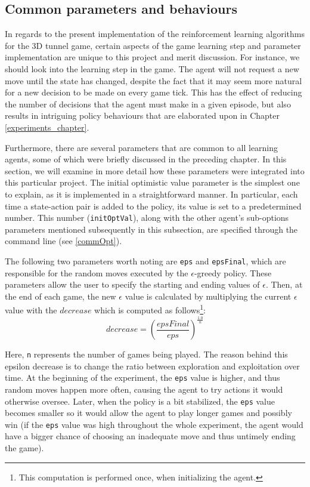 \subsection{Common parameters and behaviours}
\label{com_par_and_beh}
In regards to the present implementation of the reinforcement learning algorithms for the 3D tunnel game, certain aspects of the game learning step and parameter implementation are unique to this project and merit discussion. For instance, we should look into the learning step in the game. The agent will not request a new move until the state has changed, despite the fact that it may seem more natural for a new decision to be made on every game tick. This has the effect of reducing the number of decisions that the agent must make in a given episode, but also results in intriguing policy behaviours that are elaborated upon in Chapter \ref{experiments_chapter}.

Furthermore, there are several parameters that are common to all learning agents, some of which were briefly discussed in the preceding chapter. In this section, we will examine in more detail how these parameters were integrated into this particular project. The initial optimistic value parameter is the simplest one to explain, as it is implemented in a straightforward manner. In particular, each time a state-action pair is added to the policy, its value is set to a predetermined number. This number (\texttt{initOptVal}), along with the other agent's sub-options parameters mentioned subsequently in this subsection, are specified through the command line (see \ref{commOpt}).

The following two parameters worth noting are \texttt{eps} and \texttt{epsFinal}, which are responsible for the random moves executed by the $\epsilon$-greedy policy. These parameters allow the user to specify the starting and ending values of $\epsilon$. Then, at the end of each game, the new $\epsilon$ value is calculated by multiplying the current $\epsilon$ value with the $decrease$ which is computed as follows\footnote{This computation is performed once, when initializing the agent.}: $$decrease = (\frac{epsFinal}{eps})^{\frac{1.0}{n}}$$

Here, \texttt{n} represents the number of games being played. The reason behind this epsilon decrease is to change the ratio between exploration and exploitation over time. At the beginning of the experiment, the \texttt{eps} value is higher, and thus random moves happen more often, causing the agent to try actions it would otherwise oversee. Later, when the policy is a bit stabilized, the \texttt{eps} value becomes smaller so it would allow the agent to play longer games and possibly win (if the \texttt{eps} value was high throughout the whole experiment, the agent would have a bigger chance of choosing an inadequate move and thus untimely ending the game).

